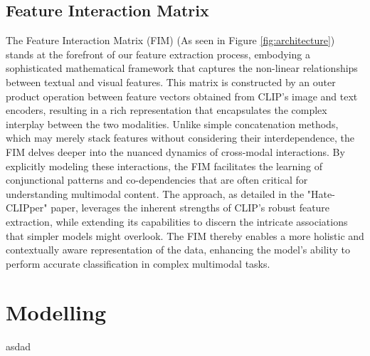 \subsection{Feature Interaction Matrix}
The Feature Interaction Matrix (FIM) (As seen in Figure \ref{fig:architecture}) stands at the forefront of our feature extraction process, embodying a sophisticated mathematical framework that captures the non-linear relationships between textual and visual features. This matrix is constructed by an outer product operation between feature vectors obtained from CLIP’s image and text encoders, resulting in a rich representation that encapsulates the complex interplay between the two modalities. Unlike simple concatenation methods, which may merely stack features without considering their interdependence, the FIM delves deeper into the nuanced dynamics of cross-modal interactions. By explicitly modeling these interactions, the FIM facilitates the learning of conjunctional patterns and co-dependencies that are often critical for understanding multimodal content. The approach, as detailed in the "Hate-CLIPper" paper, leverages the inherent strengths of CLIP’s robust feature extraction, while extending its capabilities to discern the intricate associations that simpler models might overlook. The FIM thereby enables a more holistic and contextually aware representation of the data, enhancing the model's ability to perform accurate classification in complex multimodal tasks.

\section{Modelling}
asdad

